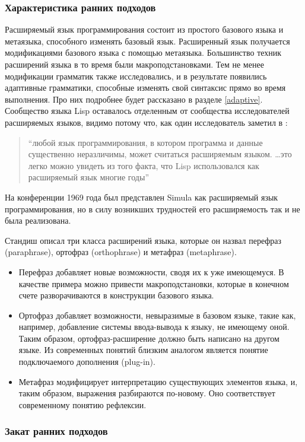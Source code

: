 \documentclass[a4paper,12pt,titlepage]{extarticle}
\begin{document}
\subsubsection*{Характеристика ранних подходов}

Расширяемый язык программирования состоит из простого базового языка и
метаязыка, способного изменять базовый язык. Расширенный язык получается
модификациями базового языка с помощью метаязыка. Большинство техник расширений
языка в то время были макроподстановками. Тем не менее модификации грамматик 
также исследовались, и в результате появились адаптивные грамматики, способные
изменять свой синтаксис прямо во время выполнения. Про них подробнее будет 
рассказано в разделе \ref{adaptive}. Сообщество языка Lisp оставалось отделенным
от сообщества исследователей расширяемых языков, видимо потому что, как один
исследователь заметил в \cite{harr60}:
\begin{quote}
``любой язык программирования, в котором программа и данные существенно
неразличимы, может считаться расширяемым языком. \ldots это легко можно увидеть
из того факта, что Lisp использовался как расширяемый язык многие годы''
\end{quote}
На конференции 1969 года был представлен Simula как расширяемый язык
программирования, но в силу возникших трудностей его расширяемость так и не
была реализована.

Стандиш описал три класса расширений языка, которые он назвал перефраз
(paraphrase), ортофраз (orthophrase) и метафраз (metaphrase).
\begin{itemize}
  \item Перефраз добавляет новые возможности, сводя их к уже имеющемуся. В
  качестве примера можно привести макроподстановки, которые в конечном счете
  разворачиваются в конструкции базового языка.
  \item Ортофраз добавляет возможности, невыразимые в базовом языке, такие как,
  например, добавление системы ввода-вывода к языку, не имеющему оной. Таким
  образом, ортофраз-расширение должно быть написано на другом языке. Из
  современных понятий близким аналогом является понятие подключаемого дополнения
  (plug-in).
  \item Метафраз модифицирует интерпретацию существующих элементов языка, и,
  таким образом, выражения разбираются по-новому. Оно соответствует
  современному понятию рефлексии.
\end{itemize}

\subsubsection*{Закат ранних подходов}
\end{document}
